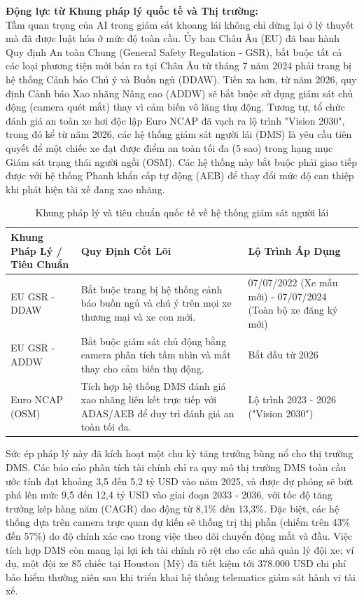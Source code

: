 \documentclass[../DoAn.tex]{subfiles}
\begin{document}
\textbf{Động lực từ Khung pháp lý quốc tế và Thị trường:} \\
Tầm quan trọng của AI trong giám sát khoang lái không chỉ dừng lại ở lý thuyết mà đã được luật hóa ở mức độ toàn cầu. Ủy ban Châu Âu (EU) đã ban hành Quy định An toàn Chung (General Safety Regulation - GSR), bắt buộc tất cả các loại phương tiện mới bán ra tại Châu Âu từ tháng 7 năm 2024 phải trang bị hệ thống Cảnh báo Chú ý và Buồn ngủ (DDAW). Tiến xa hơn, từ năm 2026, quy định Cảnh báo Xao nhãng Nâng cao (ADDW) sẽ bắt buộc sử dụng giám sát chủ động (camera quét mắt) thay vì cảm biến vô lăng thụ động. Tương tự, tổ chức đánh giá an toàn xe hơi độc lập Euro NCAP đã vạch ra lộ trình "Vision 2030", trong đó kể từ năm 2026, các hệ thống giám sát người lái (DMS) là yêu cầu tiên quyết để một chiếc xe đạt được điểm an toàn tối đa (5 sao) trong hạng mục Giám sát trạng thái người ngồi (OSM). Các hệ thống này bắt buộc phải giao tiếp được với hệ thống Phanh khẩn cấp tự động (AEB) để thay đổi mức độ can thiệp khi phát hiện tài xế đang xao nhãng.

\begin{table}[htbp]
\centering
\caption{Khung pháp lý và tiêu chuẩn quốc tế về hệ thống giám sát người lái}
\begin{tabular}{|p{3cm}|p{6cm}|p{5.5cm}|}
\hline
\textbf{Khung Pháp Lý / Tiêu Chuẩn} & \textbf{Quy Định Cốt Lõi} & \textbf{Lộ Trình Áp Dụng} \\
\hline
EU GSR - DDAW & Bắt buộc trang bị hệ thống cảnh báo buồn ngủ và chú ý trên mọi xe thương mại và xe con mới. & 07/07/2022 (Xe mẫu mới) - 07/07/2024 (Toàn bộ xe đăng ký mới) \\
\hline
EU GSR - ADDW & Bắt buộc giám sát chủ động bằng camera phân tích tầm nhìn và mắt thay cho cảm biến thụ động. & Bắt đầu từ 2026 \\
\hline
Euro NCAP (OSM) & Tích hợp hệ thống DMS đánh giá xao nhãng liên kết trực tiếp với ADAS/AEB để duy trì đánh giá an toàn tối đa. & Lộ trình 2023 - 2026 ("Vision 2030") \\
\hline
\end{tabular}
\end{table}

Sức ép pháp lý này đã kích hoạt một chu kỳ tăng trưởng bùng nổ cho thị trường DMS. Các báo cáo phân tích tài chính chỉ ra quy mô thị trường DMS toàn cầu ước tính đạt khoảng 3,5 đến 5,2 tỷ USD vào năm 2025, và được dự phóng sẽ bứt phá lên mức 9,5 đến 12,4 tỷ USD vào giai đoạn 2033 - 2036, với tốc độ tăng trưởng kép hàng năm (CAGR) dao động từ 8,1\% đến 13,3\%. Đặc biệt, các hệ thống dựa trên camera trực quan dự kiến sẽ thống trị thị phần (chiếm trên 43\% đến 57\%) do độ chính xác cao trong việc theo dõi chuyển động mắt và đầu. Việc tích hợp DMS còn mang lại lợi ích tài chính rõ rệt cho các nhà quản lý đội xe; ví dụ, một đội xe 85 chiếc tại Houston (Mỹ) đã tiết kiệm tới 378.000 USD chi phí bảo hiểm thường niên sau khi triển khai hệ thống telematics giám sát hành vi tài xế.
\end{document}
